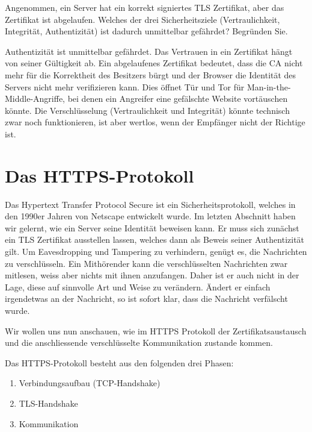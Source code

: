         \begin{myexercise}
            Angenommen, ein Server hat ein korrekt signiertes TLS Zertifikat, aber das Zertifikat ist abgelaufen. Welches der drei Sicherheitsziele (Vertraulichkeit, Integrität, Authentizität) ist dadurch unmittelbar gefährdet? Begründen Sie.
            \begin{myanswer}
                Authentizität ist unmittelbar gefährdet. Das Vertrauen in ein Zertifikat hängt von seiner Gültigkeit ab. Ein abgelaufenes Zertifikat bedeutet, dass die CA nicht mehr für die Korrektheit des Besitzers bürgt und der Browser die Identität des Servers nicht mehr verifizieren kann. Dies öffnet Tür und Tor für Man-in-the-Middle-Angriffe, bei denen ein Angreifer eine gefälschte Website vortäuschen könnte. Die Verschlüsselung (Vertraulichkeit und Integrität) könnte technisch zwar noch funktionieren, ist aber wertlos, wenn der Empfänger nicht der Richtige ist.
            \end{myanswer}
        \end{myexercise}

    \section{Das HTTPS-Protokoll}
        Das Hypertext Transfer Protocol Secure ist ein Sicherheitsprotokoll, welches in den 1990er Jahren von Netscape entwickelt wurde. Im letzten Abschnitt haben wir gelernt, wie ein Server seine Identität beweisen kann. Er muss sich zunächst ein TLS Zertifikat ausstellen lassen, welches dann als Beweis seiner Authentizität gilt. Um Eavesdropping und Tampering zu verhindern, genügt es, die Nachrichten zu verschlüsseln. Ein Mithörender kann die verschlüsselten Nachrichten zwar mitlesen, weiss aber nichts mit ihnen anzufangen. Daher ist er auch nicht in der Lage, diese auf sinnvolle Art und Weise zu verändern. Ändert er einfach irgendetwas an der Nachricht, so ist sofort klar, dass die Nachricht verfälscht wurde. 

        Wir wollen uns nun anschauen, wie im HTTPS Protokoll der Zertifikatsaustausch und die anschliessende verschlüsselte Kommunikation zustande kommen. 

        Das HTTPS-Protokoll besteht aus den folgenden drei Phasen:

        \begin{enumerate} 
            \item Verbindungsaufbau (TCP-Handshake) 
            \item TLS-Handshake 
            \item Kommunikation 
        \end{enumerate}

